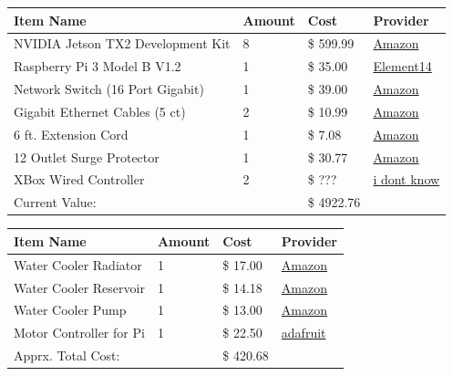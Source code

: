 \documentclass{article}
\begin{document}
\begin{center}
    \center
    \begin{tabular}{ | l | l | l | l |}
    \hline
    Item Name & Amount & Cost & Provider \\ \hline
	NVIDIA Jetson TX2 Development Kit & 8 & \$ 599.99 & \href{https://www.amazon.com/dp/B06XPFH939/ref=cm_sw_r_cp_dp_T1_2y1FzbPSCWS3Q}{Amazon}\\ \hline
	Raspberry Pi 3 Model B V1.2 & 1 & \$ 35.00 & \href{www.newark.com/raspberry-pi/rpi2-modb-v1-2/sbc-raspberry-pi-2-model-b-v1/dp/95Y1948?COM=superwidget-link_RaspberryPi}{Element14}\\ \hline
    Network Switch (16 Port Gigabit) & 1 & \$ 39.00 & \href{http://a.co/9ZxWnFD}{Amazon} \\ \hline
    Gigabit Ethernet Cables (5 ct) & 2 & \$ 10.99 & \href{https://www.amazon.com/dp/B01INRUFGK/ref=cm_sw_r_cp_dp_T1_RxhGzbGBQHJKQ}{Amazon} \\ \hline
    6 ft. Extension Cord & 1 & \$ 7.08 & \href{http://a.co/dOocaaY}{Amazon} \\ \hline
    12 Outlet Surge Protector & 1 & \$ 30.77 & \href{http://a.co/dXDFZkl}{Amazon} \\ \hline
    XBox Wired Controller & 2 & \$ ??? & \href{purple.com}{i dont know} \\ \hline
    Current Value: & & \$ 4922.76 & \\ \hline
    \end{tabular}
\begin{tabular}{ | l | l | l | l |}
    \hline
    Item Name & Amount & Cost & Provider \\ \hline
    Water Cooler Radiator & 1 & \$ 17.00 & \href{http://a.co/1dHksiW}{Amazon} \\ \hline
    Water Cooler Reservoir & 1 & \$ 14.18 & \href{http://a.co/0tiCxUf}{Amazon} \\ \hline
    Water Cooler Pump & 1  & \$ 13.00 & \href{http://a.co/dSwtybB}{Amazon} \\ \hline
    Motor Controller for Pi & 1 & \$ 22.50 & \href{https://www.adafruit.com/product/2348}{adafruit}\\ \hline
    Apprx. Total Cost: & & \$ 420.68 & \\
    \hline
    \end{tabular}
\end{center}
\end{document}
